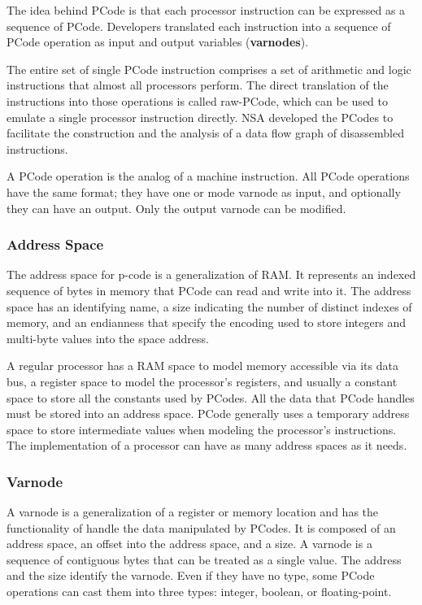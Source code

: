 The idea behind PCode is that each processor instruction can be expressed as a sequence of PCode. Developers translated each instruction into a sequence of PCode operation as input and output variables (\textbf{varnodes}).

The entire set of single PCode instruction comprises a set of arithmetic and logic instructions that almost all processors perform. The direct translation of the instructions into those operations is called raw-PCode, which can be used to emulate a single processor instruction directly. NSA developed the PCodes to facilitate the construction and the analysis of a data flow graph of disassembled instructions.

A PCode operation is the analog of a machine instruction.  All PCode operations have the same format; they have one or mode varnode as input, and optionally they can have an output. Only the output varnode can be modified. 

\subsubsection{Address Space}

The address space for p-code is a generalization of RAM. It represents an indexed sequence of bytes in memory that PCode can read and write into it. The address space has an identifying name, a size indicating the number of distinct indexes of memory, and an endianness that specify the encoding used to store integers and multi-byte values into the space address.

A regular processor has a RAM space to model memory accessible via its data bus, a register space to model the processor's registers, and usually a constant space to store all the constants used by PCodes. All the data that PCode handles must be stored into an address space. 
PCode generally uses a temporary address space to store intermediate values when modeling the processor's instructions. 
The implementation of a processor can have as many address spaces as it needs.


\subsubsection{Varnode}
A varnode is a generalization of a register or memory location and has the functionality of handle the data manipulated by PCodes. It is composed of an address space, an offset into the address space, and a size. 
A varnode is a sequence of contiguous bytes that can be treated as a single value. The address and the size identify the varnode. Even if they have no type, some PCode operations can cast them into three types: integer, boolean, or floating-point. 

